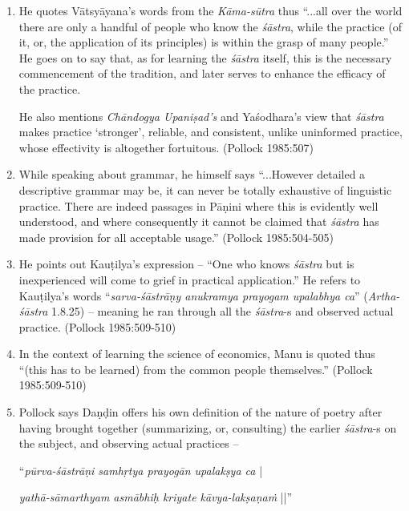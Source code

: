 \begin{enumerate}
\item He quotes Vātsyāyana's words from the {\it Kāma-sūtra} thus ``...all over the world there are only a handful of people who know the {\it śāstra}, while the practice (of it, or, the application of its principles) is within the grasp of many people.'' He goes on to say that, as for learning the {\it śāstra} itself, this is the necessary commencement of the tradition, and later serves to enhance the efficacy of the practice. 

He also mentions \textsl{Chāndogya Upaniṣad's} and Yaśodhara's view that {\it śāstra} makes practice `stronger', reliable, and consistent, unlike uninformed practice, whose effectivity is altogether fortuitous. (Pollock 1985:507)

\item While speaking about grammar, he himself says ``...However detailed a descriptive grammar may be, it can never be totally exhaustive of linguistic practice. There are indeed passages in Pāṇini where this is evidently well understood, and where consequently it cannot be claimed that {\it śāstra} has made provision for all acceptable usage.'' (Pollock 1985:504-505)

\item He points out Kauṭilya's expression -- ``One who knows {\it śāstra} but is inexperienced will come to grief in practical application.'' He refers to Kauṭilya's words ``\textsl{sarva-śāstrāṇy anukramya prayogam upalabhya ca}'' (\textsl{Artha-śāstra} 1.8.25) -- meaning he ran through all the {\it śāstra}-s and observed actual practice. (Pollock 1985:509-510)

\item In the context of learning the science of economics, Manu is quoted thus ``(this has to be learned) from the common people themselves.'' (Pollock 1985:509-510)

\item Pollock says Daṇḍin offers his own definition of the nature of poetry after having brought together (summarizing, or, consulting) the earlier {\it śāstra}-s on the subject, and observing actual practices -- 

``\textsl{pūrva-śāstrāṇi samhṛtya prayogān upalakṣya ca} | 

\textsl{yathā-sāmarthyam asmābhiḥ kriyate kāvya-lakṣaṇaṁ} ||'' 


\end{enumerate}
